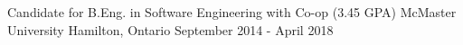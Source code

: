 \begin{cventries}
  \cventry
    {Candidate for B.Eng. in Software Engineering with Co-op (3.45 GPA)}
    {McMaster University}
    {Hamilton, Ontario}
    {September 2014 - April 2018}
    {}
\end{cventries}
